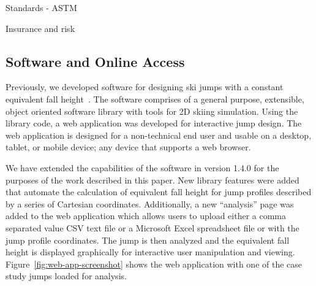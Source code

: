 \documentclass{article}
\begin{document}
Standards - ASTM

Insurance and risk

\subsection{Software and Online Access}
%
Previously, we developed software for designing ski jumps with a constant
equivalent fall height~\cite{Moore2018}. The software comprises of a general
purpose, extensible, object oriented software library with tools for 2D skiing
simulation. Using the library code, a web application was developed for
interactive jump design. The web application is designed for a non-technical
end user and usable on a desktop, tablet, or mobile device; any device that
supports a web browser.

We have extended the capabilities of the software in version 1.4.0 for the
purposes of the work described in this paper. New library features were added
that automate the calculation of equivalent fall height for jump profiles
described by a series of Cartesian coordinates.  Additionally, a new
``analysis'' page was added to the web application which allows users to upload
either a comma separated value CSV text file or a Microsoft Excel spreadsheet
file or with the jump profile coordinates. The jump is then analyzed and the
equivalent fall height is displayed graphically for interactive user
manipulation and viewing. Figure~\ref{fig:web-app-screenshot} shows the web
application with one of the case study jumps loaded for analysis.
%
\end{document}
